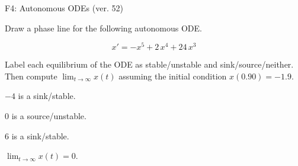 \begin{exercise}
  \begin{exerciseTitle}F4: Autonomous ODEs (ver. 52)\end{exerciseTitle}
  \begin{exerciseStatement}
    

      Draw a phase line for the following 
      autonomous ODE.
    

    
\[x'= -x^{5} + 2 \, x^{4} + 24 \, x^{3}\]

    

      Label each equilibrium of the ODE
      as stable/unstable and sink/source/neither.
      Then compute \(\lim_{t\to\infty}x(t)\)
      assuming the initial condition
      \(x( 0.90 )= -1.9\).
    

  \end{exerciseStatement}
  \begin{exerciseAnswer}
    

      \(-4\) is a sink/stable.
      
        \(0\) is a source/unstable.
      
      \(6\) is a sink/stable.
    

    

      \(\lim_{t\to\infty}x(t)=0\).
    

  \end{exerciseAnswer}
\end{exercise}
